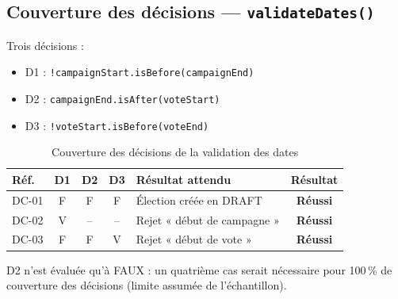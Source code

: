 \documentclass[12pt,a4paper]{report}
\newcommand{\ok}{\textcolor{okgreen}{\textbf{Réussi}}}
\begin{document}
\subsection{Couverture des décisions --- \texttt{validateDates()}}
Trois décisions :
\begin{itemize}
  \item D1 : \texttt{!campaignStart.isBefore(campaignEnd)}
  \item D2 : \texttt{campaignEnd.isAfter(voteStart)}
  \item D3 : \texttt{!voteStart.isBefore(voteEnd)}
\end{itemize}
\begin{table}[H]
\centering
\caption{Couverture des décisions de la validation des dates}
\small
\begin{tabular}{@{}lccclc@{}}
\toprule
\rowcolor{evlight}\textbf{Réf.} & \textbf{D1} & \textbf{D2} & \textbf{D3} & \textbf{Résultat attendu} & \textbf{Résultat}\\
\midrule
DC-01 & F & F & F & Élection créée en DRAFT & \ok\\
DC-02 & V & -- & -- & Rejet « début de campagne » & \ok\\
DC-03 & F & F & V & Rejet « début de vote » & \ok\\
\bottomrule
\end{tabular}
\end{table}
D2 n'est évaluée qu'à FAUX : un quatrième cas serait nécessaire pour 100\,\% de couverture des décisions (limite assumée de l'échantillon).
\end{document}
